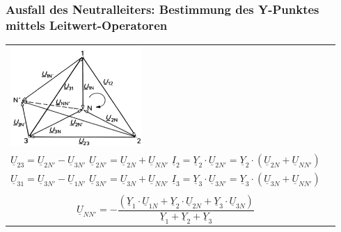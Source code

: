         \subsubsection{Ausfall des Neutralleiters: Bestimmung des Y-Punktes mittels Leitwert-Operatoren}
            \begin{tabular}{p{5cm}p{13cm}}
            	\begin{minipage}{8cm}
                	\includegraphics[width=5cm]{bilder/ZeigerdarstellungVerschobenerSternpunkt.png}
                \end{minipage} &
				\begin{minipage}{13cm}
					\begin{center}
						$ \underline{U}_{12}; \underline{U}_{23}; \underline{U}_{31} \Rightarrow const$
					\end{center}
                	$\underline{U}_{12} = \underline{U}_{1N'} - \underline{U}_{2N'}$ \hspace{0.3cm}
                	$\underline{U}_{1N'} = \underline{U}_{1N} + \underline{U}_{NN'}$ \hspace{0.3cm}
                	$\underline{I}_1 = \underline{Y}_1 \cdot \underline{U}_{1N'} = \underline{Y}_1 \cdot (\underline{U}_{1N} + \underline{U}_{NN'})$ \\
                	$\underline{U}_{23} = \underline{U}_{2N'} - \underline{U}_{3N'}$ \hspace{0.3cm}
                	$\underline{U}_{2N'} = \underline{U}_{2N} + \underline{U}_{NN'}$ \hspace{0.3cm}
                	$\underline{I}_2 = \underline{Y}_2 \cdot \underline{U}_{2N'} = \underline{Y}_2
                	\cdot (\underline{U}_{2N} + \underline{U}_{NN'})$ \\ $\underline{U}_{31} = \underline{U}_{3N'} - \underline{U}_{1N'}$ \hspace{0.3cm}
                	$\underline{U}_{3N'} = \underline{U}_{3N} + \underline{U}_{NN'}$ \hspace{0.3cm}
                	$\underline{I}_3 = \underline{Y}_3 \cdot \underline{U}_{3N'} = \underline{Y}_3
                	\cdot (\underline{U}_{3N} + \underline{U}_{NN'})$ \\ \\ 
                	$$\underline{U}_{NN'} = \boldsymbol{-} \frac{(\underline{Y}_1 \cdot
                	\underline{U}_{1N} + \underline{Y}_2 \cdot \underline{U}_{2N} + \underline{Y}_3 \cdot
                	\underline{U}_{3N})}{\underline{Y}_1 + \underline{Y}_2 +
                	\underline{Y}_3}$$
                \end{minipage}
			\end{tabular}

